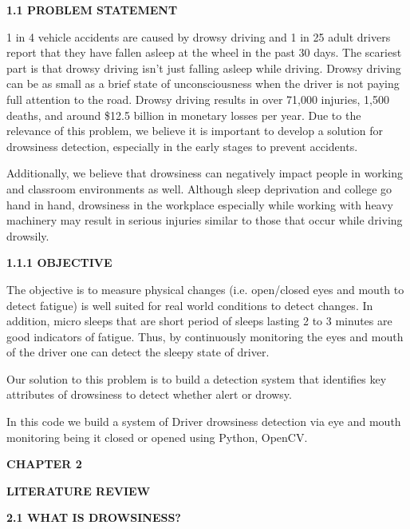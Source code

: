 \documentclass[a4paper,12pt]{article}
\begin{document}
\textbf{1.1 PROBLEM STATEMENT}

1 in 4 vehicle accidents are caused by drowsy driving and 1 in 25 adult
drivers report that they have fallen asleep at the wheel in the past 30
days. The scariest part is that drowsy driving isn't just falling asleep
while driving. Drowsy driving can be as small as a brief state of
unconsciousness when the driver is not paying full attention to the
road. Drowsy driving results in over 71,000 injuries, 1,500 deaths, and
around \$12.5 billion in monetary losses per year. Due to the relevance
of this problem, we believe it is important to develop a solution for
drowsiness detection, especially in the early stages to prevent
accidents.

Additionally, we believe that drowsiness can negatively impact people in
working and classroom environments as well. Although sleep deprivation
and college go hand in hand, drowsiness in the workplace especially
while working with heavy machinery may result in serious injuries
similar to those that occur while driving drowsily.

\textbf{1.1.1 OBJECTIVE}

The objective is to measure physical changes (i.e. open/closed eyes and
mouth to detect fatigue) is well suited for real world conditions to
detect changes. In addition, micro sleeps that are short period of
sleeps lasting 2 to 3 minutes are good indicators of fatigue. Thus, by
continuously monitoring the eyes and mouth of the driver one can detect
the sleepy state of driver.

Our solution to this problem is to build a detection system that
identifies key attributes of drowsiness to detect whether alert or
drowsy.

In this code we build a system of Driver drowsiness detection via eye
and mouth monitoring being it closed or opened using Python, OpenCV.

\textbf{CHAPTER 2}

\textbf{LITERATURE REVIEW}

\textbf{2.1 WHAT IS DROWSINESS?}
\end{document}
